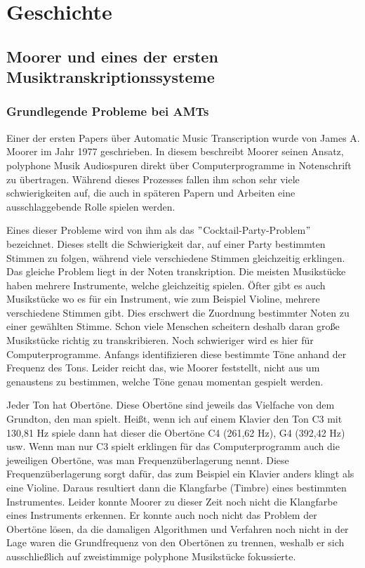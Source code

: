 \section{Geschichte}

\subsection{Moorer und eines der ersten Musiktranskriptionssysteme}
\subsubsection{Grundlegende Probleme bei AMTs}
Einer der ersten Papers über Automatic Music Transcription wurde von James A. Moorer im Jahr 1977 geschrieben.
\cite{Moorer1977}
In diesem beschreibt Moorer seinen Ansatz, polyphone Musik Audiospuren
direkt über Computerprogramme in Notenschrift zu übertragen.
Während dieses Prozesses fallen ihm schon sehr viele schwierigkeiten auf, die auch in späteren Papern und Arbeiten
eine ausschlaggebende Rolle spielen werden.

Eines dieser Probleme wird von ihm als das \("\)Cocktail-Party-Problem\("\) bezeichnet.
Dieses stellt die Schwierigkeit dar, auf einer Party bestimmten Stimmen zu folgen, während viele verschiedene Stimmen
gleichzeitig erklingen.
Das gleiche Problem liegt in der Noten transkription.
Die meisten Musikstücke haben mehrere Instrumente, welche gleichzeitig spielen.
Öfter gibt es auch Musikstücke wo es für ein Instrument, wie zum Beispiel Violine, mehrere verschiedene Stimmen gibt.
Dies erschwert die Zuordnung bestimmter Noten zu einer gewählten Stimme.
Schon viele Menschen scheitern deshalb daran große Musikstücke richtig zu transkribieren.
Noch schwieriger wird es hier für Computerprogramme.
Anfangs identifizieren diese bestimmte Töne anhand der Frequenz des Tons.
Leider reicht das, wie Moorer feststellt, nicht aus um genaustens zu bestimmen,
welche Töne genau momentan gespielt werden.

Jeder Ton hat Obertöne.
Diese Obertöne sind jeweils das Vielfache von dem Grundton, den man spielt.
Heißt, wenn ich auf einem Klavier den Ton C3 mit 130,81 Hz spiele dann hat dieser
die Obertöne C4 (261,62 Hz), G4 (392,42 Hz) usw.
Wenn man nur C3 spielt erklingen für das Computerprogramm auch die jeweiligen Obertöne,
was man Frequenzüberlagerung nennt.
Diese Frequenzüberlagerung sorgt dafür, das zum Beispiel ein Klavier anders klingt als eine Violine.
Daraus resultiert dann die Klangfarbe (Timbre) eines bestimmten Instrumentes.
\cite{goswami2013timbre}
Leider konnte Moorer zu dieser Zeit noch nicht die Klangfarbe eines Instruments erkennen.
Er konnte auch noch nicht das Problem der Obertöne lösen,
da die damaligen Algorithmen und Verfahren noch nicht in der Lage waren die Grundfrequenz von den Obertönen zu trennen,
weshalb er sich ausschließlich auf zweistimmige polyphone Musikstücke fokussierte.

